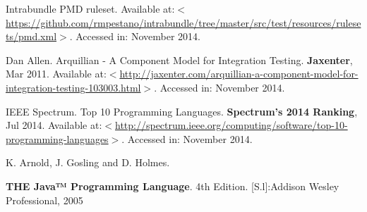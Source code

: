 \documentclass[cic,tc,english]{iiufrgs} %
\begin{document}
\begin{thebibliography}{este-parametro-nao-eh-usado-pelo-estilo-ABNT}
Intrabundle PMD ruleset. Available at:$<$\url{https://github.com/rmpestano/intrabundle/tree/master/src/test/resources/rulesets/pmd.xml}$>$. Accessed in: November 2014.

 Dan Allen.
Arquillian - A Component Model for Integration Testing. \textbf{Jaxenter}, Mar 2011. Available at:$<$\url{http://jaxenter.com/arquillian-a-component-model-for-integration-testing-103003.html}$>$. Accessed in: November 2014.

 IEEE Spectrum.
Top 10 Programming Languages. \textbf{Spectrum’s 2014 Ranking}, Jul 2014. Available at:$<$\url{http://spectrum.ieee.org/computing/software/top-10-programming-languages}$>$. Accessed in: November 2014.

 K. Arnold, J. Gosling and D. Holmes.

\textbf{THE Java™ Programming Language}. 4th Edition. [S.l]:Addison Wesley Professional, 2005


\end{thebibliography}
\end{document}
